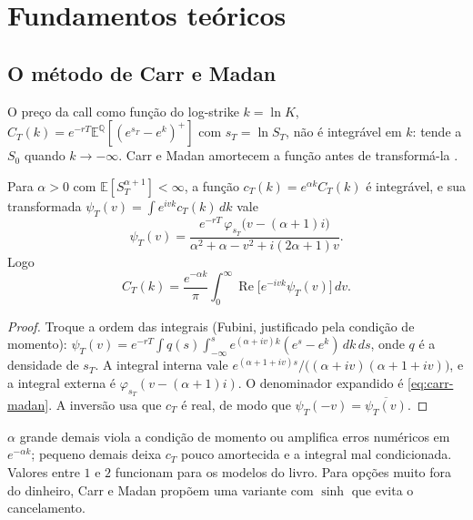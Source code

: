 \section{Fundamentos teóricos}

\subsection{O método de Carr e Madan}

O preço da call como função do log-strike $k=\ln K$, $C_T(k)=e^{-rT}\mathbb E^{\mathbb Q}[(e^{s_T}-e^k)^+]$ com $s_T=\ln S_T$, não é integrável em $k$: tende a $S_0$ quando $k\to-\infty$. Carr e Madan amortecem a função antes de transformá-la \citep{carrmadan1999}.

\begin{proposicao}
Para $\alpha>0$ com $\mathbb E[S_T^{\alpha+1}]<\infty$, a função $c_T(k)=e^{\alpha k}C_T(k)$ é integrável, e sua transformada $\psi_T(v)=\int e^{ivk}c_T(k)\,dk$ vale
\begin{equation}\label{eq:carr-madan}
\psi_T(v)=\frac{e^{-rT}\,\varphi_{s_T}\big(v-(\alpha+1)i\big)}{\alpha^2+\alpha-v^2+i(2\alpha+1)v}.
\end{equation}
Logo
\begin{equation}
C_T(k)=\frac{e^{-\alpha k}}{\pi}\int_0^\infty\operatorname{Re}\big[e^{-ivk}\psi_T(v)\big]\,dv.
\end{equation}
\end{proposicao}

\begin{proof}
Troque a ordem das integrais (Fubini, justificado pela condição de momento):
$\psi_T(v)=e^{-rT}\int q(s)\int_{-\infty}^{s}e^{(\alpha+iv)k}(e^s-e^k)\,dk\,ds$, onde $q$ é a densidade de $s_T$. A integral interna vale $e^{(\alpha+1+iv)s}\big/\big((\alpha+iv)(\alpha+1+iv)\big)$, e a integral externa é $\varphi_{s_T}(v-(\alpha+1)i)$. O denominador expandido é \eqref{eq:carr-madan}. A inversão usa que $c_T$ é real, de modo que $\psi_T(-v)=\overline{\psi_T(v)}$.
\end{proof}

\begin{observacao}
$\alpha$ grande demais viola a condição de momento ou amplifica erros numéricos em $e^{-\alpha k}$; pequeno demais deixa $c_T$ pouco amortecida e a integral mal condicionada. Valores entre $1$ e $2$ funcionam para os modelos do livro. Para opções muito fora do dinheiro, Carr e Madan propõem uma variante com $\sinh$ que evita o cancelamento.
\end{observacao}

